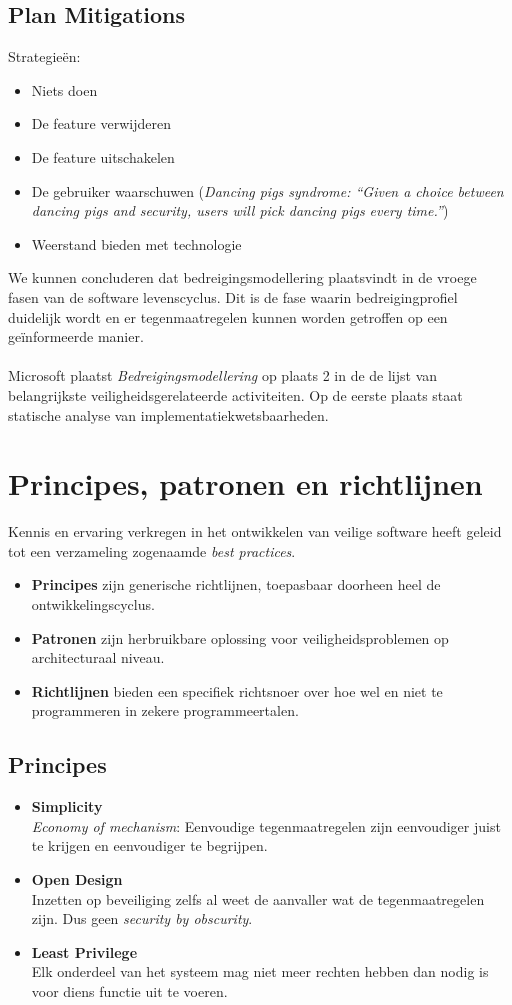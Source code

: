 \documentclass[../main.tex]{subfiles}
\begin{document}
\subsection{Plan Mitigations}
Strategie\"en:
\begin{itemize}
	\item Niets doen
	\item De feature verwijderen
	\item De feature uitschakelen
	\item De gebruiker waarschuwen (\textit{Dancing pigs syndrome: ``Given a choice between dancing pigs and security, users will pick dancing pigs every time.''})
	\item Weerstand bieden met technologie
\end{itemize} 

We kunnen concluderen dat bedreigingsmodellering  plaatsvindt in de vroege fasen van de software levenscyclus. Dit is de fase waarin bedreigingprofiel duidelijk wordt en er tegenmaatregelen kunnen worden getroffen op een ge\"informeerde manier. 
\\\\
Microsoft plaatst \textit{Bedreigingsmodellering} op plaats 2 in de de lijst van belangrijkste veiligheidsgerelateerde activiteiten. Op de eerste plaats staat statische analyse van implementatiekwetsbaarheden.

\section{Principes, patronen en richtlijnen}
Kennis en ervaring verkregen in het ontwikkelen van veilige software heeft geleid tot een verzameling zogenaamde \textit{best practices}. 
\begin{itemize}
	\item \textbf{Principes} zijn generische richtlijnen, toepasbaar doorheen heel de ontwikkelingscyclus.
	\item \textbf{Patronen} zijn herbruikbare oplossing voor veiligheidsproblemen op architecturaal niveau.
	\item \textbf{Richtlijnen} bieden een specifiek richtsnoer over hoe wel en niet te programmeren in zekere programmeertalen. 
\end{itemize}

\subsection{Principes}
\begin{itemize}
	\item \textbf{Simplicity} \\ 
	\textit{Economy of mechanism}: Eenvoudige tegenmaatregelen zijn eenvoudiger juist te krijgen en eenvoudiger te begrijpen.
	\item \textbf{Open Design} \\
	Inzetten op beveiliging zelfs al weet de aanvaller wat de tegenmaatregelen zijn. Dus geen  \textit{security by obscurity}.
	\item \textbf{Least Privilege} \\ 
	Elk onderdeel van het systeem mag niet meer rechten hebben dan nodig is voor diens functie uit te voeren.
\end{itemize}
\end{document}
